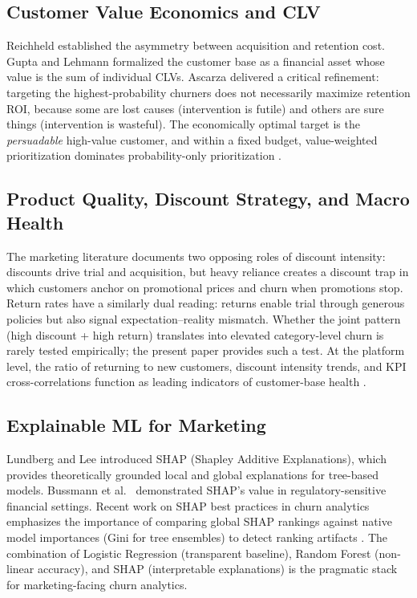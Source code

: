 \documentclass[conference]{IEEEtran}
\begin{document}
\subsection{Customer Value Economics and CLV}

Reichheld \cite{reichheld2001} established the asymmetry between acquisition and retention cost. Gupta and Lehmann \cite{gupta2005} formalized the customer base as a financial asset whose value is the sum of individual CLVs. Ascarza \cite{ascarza2018} delivered a critical refinement: targeting the highest-probability churners does not necessarily maximize retention ROI, because some are lost causes (intervention is futile) and others are sure things (intervention is wasteful). The economically optimal target is the \emph{persuadable} high-value customer, and within a fixed budget, value-weighted prioritization dominates probability-only prioritization \cite{verhoef2010}.

\subsection{Product Quality, Discount Strategy, and Macro Health}

The marketing literature documents two opposing roles of discount intensity: discounts drive trial and acquisition, but heavy reliance creates a discount trap in which customers anchor on promotional prices and churn when promotions stop. Return rates have a similarly dual reading: returns enable trial through generous policies but also signal expectation--reality mismatch. Whether the joint pattern (high discount + high return) translates into elevated category-level churn is rarely tested empirically; the present paper provides such a test. At the platform level, the ratio of returning to new customers, discount intensity trends, and KPI cross-correlations function as leading indicators of customer-base health \cite{neslin2006}.

\subsection{Explainable ML for Marketing}

Lundberg and Lee \cite{lundberg2017} introduced SHAP (Shapley Additive Explanations), which provides theoretically grounded local and global explanations for tree-based models. Bussmann et al.\ \cite{bussmann2021} demonstrated SHAP's value in regulatory-sensitive financial settings. Recent work on SHAP best practices in churn analytics emphasizes the importance of comparing global SHAP rankings against native model importances (Gini for tree ensembles) to detect ranking artifacts \cite{molnar2022}. The combination of Logistic Regression (transparent baseline), Random Forest (non-linear accuracy), and SHAP (interpretable explanations) is the pragmatic stack for marketing-facing churn analytics.
\end{document}
